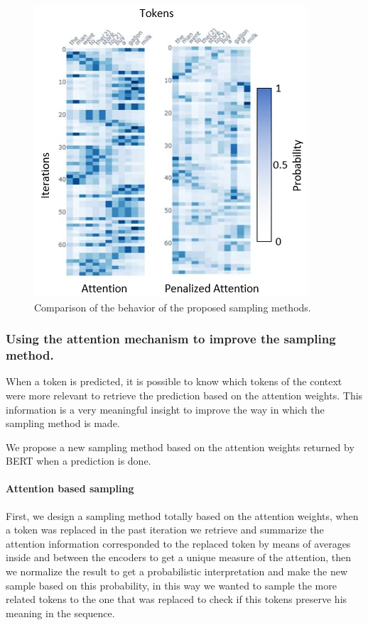 \documentclass[10pt,twocolumn,letterpaper]{article}
\begin{document}
\begin{figure}
   \centering
   \includegraphics[scale=1]{attComp.PNG}
   \caption{Comparison of the behavior of the proposed sampling methods.}
   \label{fig:AttentComp}
\end{figure}

\subsubsection{Using the attention mechanism to improve the sampling method.}
When a token is predicted, it is possible to know which tokens of the context were more relevant to
retrieve the prediction based on the attention weights.
This information is a very meaningful insight to improve
the way in which the sampling method is made.

We propose a new sampling method based on the attention
weights returned by BERT when a prediction is done.

\paragraph{Attention based sampling}
First, we design a sampling method totally based on the attention weights,
when a token was replaced in the past iteration we retrieve and summarize the
attention information corresponded to the replaced token by means of averages
inside and between the encoders to get a unique measure of the attention, then
we normalize the result to get a probabilistic interpretation and make the new
sample based on this probability, in this way we wanted to sample the more related
tokens to the one that was replaced to check if this tokens preserve his meaning in the sequence.
\end{document}
